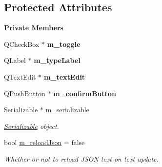 \subsection*{Protected Attributes}
\begin{Indent}\textbf{ Private Members}\par
\begin{DoxyCompactItemize}
\item 
\mbox{\label{classrev_1_1_view_1_1_json_widget_a177ec5ec376b720df02e5bed0c5d3cfe}} 
Q\+Check\+Box $\ast$ {\bfseries m\+\_\+toggle}
\item 
\mbox{\label{classrev_1_1_view_1_1_json_widget_a1f336e6efb9fa196b2d816dfe29adb50}} 
Q\+Label $\ast$ {\bfseries m\+\_\+type\+Label}
\item 
\mbox{\label{classrev_1_1_view_1_1_json_widget_a4bbf5bfec82d7c1cbdf7f192a3a5267b}} 
Q\+Text\+Edit $\ast$ {\bfseries m\+\_\+text\+Edit}
\item 
\mbox{\label{classrev_1_1_view_1_1_json_widget_a063bd3a49ce192e0be76322a6c849c9b}} 
Q\+Push\+Button $\ast$ {\bfseries m\+\_\+confirm\+Button}
\item 
\mbox{\label{classrev_1_1_view_1_1_json_widget_a51049a80aa129a43628c5a7e50251407}} 
\mbox{\hyperlink{classrev_1_1_serializable}{Serializable}} $\ast$ \mbox{\hyperlink{classrev_1_1_view_1_1_json_widget_a51049a80aa129a43628c5a7e50251407}{m\+\_\+serializable}}
\begin{DoxyCompactList}\small\item\em \mbox{\hyperlink{classrev_1_1_serializable}{Serializable}} object. \end{DoxyCompactList}\item 
\mbox{\label{classrev_1_1_view_1_1_json_widget_a0fa64da59d1231761fc7409ecc93ca16}} 
bool \mbox{\hyperlink{classrev_1_1_view_1_1_json_widget_a0fa64da59d1231761fc7409ecc93ca16}{m\+\_\+reload\+Json}} = false
\begin{DoxyCompactList}\small\item\em Whether or not to reload J\+S\+ON text on text update. \end{DoxyCompactList}\end{DoxyCompactItemize}
\end{Indent}
